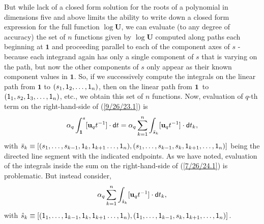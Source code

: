 \documentclass{amsart}
\numberwithin{equation}{section}
\theoremstyle{definition}
\numberwithin{theorem}{section}
\begin{document}
But while lack of a closed form solution for the roots of a polynomial in dimensions five and above limits the ability to write down a closed form expression for the full function $\log\mathbf{U}$, we can evaluate (to any degree of accuracy) the set of $n$ functions given by $\log\mathbf{U}$ computed along paths each beginning at $\mathbf{1}$ and proceeding parallel to each of the component axes of $s$ - because each integrand again has only a single component of $s$ that is varying on the path, but now the other components of $s$ only appear as their known component values in $\mathbf{1}$.  
So, if we successively compute the integrals on the linear path from $\mathbf{1}$ to $(s_1,{\sf 1}_2,\dots,{\sf 1}_n)$, then on the linear path from \mbox{$\mathbf{1}$ to} $({\sf 1}_1,s_2,{\sf 1}_3,\dots,{\sf 1}_n)$, etc., we obtain this set of $n$ functions. 
\enlargethispage{1cm} Now, evaluation of $q$-th term on the right-hand-side of (\ref{9/26/23.1}) is \begin{equation}\label{7/26/24.1} \alpha_q\int_{\mathbf{1}}^s [\mathbf{u}_q t^{-1}]\cdot {\sf d}t = \alpha_q\sum_{k=1}^n \int_{\bar{s}_k} [\mathbf{u}_q t^{-1}]\cdot {\sf d}t_k,\end{equation} with $\bar{s}_k \equiv [(s_1,\dots,s_{k-1},{\sf 1}_{k},{\sf 1}_{k+1}\dots,{\sf 1}_n),(s_1,\dots,s_{k-1},s_k,{\sf 1}_{k+1},\dots,{\sf 1}_n)]$ being the directed line segment with the indicated endpoints.   As we have noted, evaluation of the integrals inside the sum on the right-hand-side of (\ref{7/26/24.1}) is problematic.  But instead consider,  \begin{equation}\label{7/26/24.2}\alpha_q\sum_{k=1}^n \int_{\hat{s}_k} [\mathbf{u}_q t^{-1}]\cdot {\sf d}t_k,\end{equation} with $\hat{s}_k \equiv [({\sf 1}_1,\dots,{\sf 1}_{k-1},{\sf 1}_{k},{\sf 1}_{k+1}\dots,{\sf 1}_n),({\sf 1}_1,\dots,{\sf 1}_{k-1},s_k,{\sf 1}_{k+1},\dots,{\sf 1}_n)]$. 
\end{document}
